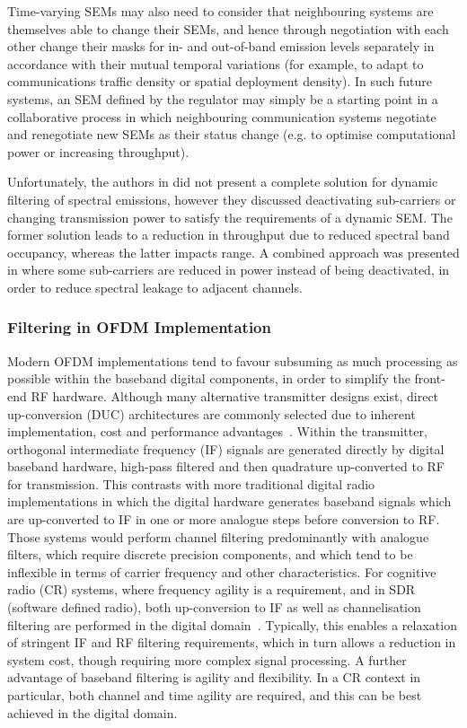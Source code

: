 Time-varying SEMs may also need to consider that neighbouring systems are themselves able to change their SEMs, and hence through negotiation with each other change their masks for in- and out-of-band emission levels separately in accordance with their mutual temporal variations (for example, to adapt to communications traffic density or spatial deployment density).
In such future systems, an SEM defined by the regulator may simply be a starting point in a collaborative process in which neighbouring communication systems negotiate and renegotiate new SEMs as their status change (e.g. to optimise computational power or increasing throughput).

Unfortunately, the authors in \cite{Forde2010} did not present a complete solution for dynamic filtering of spectral emissions, however they discussed deactivating sub-carriers or changing transmission power to satisfy the requirements of a dynamic SEM.
The former solution leads to a reduction in throughput due to reduced spectral band occupancy, whereas the latter impacts range.
A combined approach was presented in \cite{Kryszkiewicz2013} where some sub-carriers are reduced in power instead of being deactivated, in order to reduce spectral leakage to adjacent channels.

\subsubsection{Filtering in OFDM Implementation}
\label{sec:how_ofdm_works}

Modern OFDM implementations tend to favour subsuming as much processing as possible within the baseband digital components, in order to simplify the front-end RF hardware.
Although many alternative transmitter designs exist, direct up-conversion (DUC) architectures are commonly selected due to inherent implementation, cost and performance advantages~\cite{masse2006direct}.
Within the transmitter, orthogonal intermediate frequency (IF) signals are generated directly by digital baseband hardware, high-pass filtered and then quadrature up-converted to RF for transmission.
This contrasts with more traditional digital radio implementations in which the digital hardware generates baseband signals which are up-converted to IF in one or more analogue steps before conversion to RF.
Those systems would perform channel filtering predominantly with analogue filters, which require discrete precision components, and which tend to be inflexible in terms of carrier frequency and other characteristics.
For cognitive radio (CR) systems, where frequency agility is a requirement, and in SDR (software defined radio), both up-conversion to IF as well as channelisation filtering are performed in the digital domain~\cite{Chen2005,Dowle2006}.
Typically, this enables a relaxation of stringent IF and RF filtering requirements, which in turn allows a reduction in system cost, though requiring more complex signal processing.
A further advantage of baseband filtering is agility and flexibility.
In a CR context in particular, both channel and time agility are required, and this can be best achieved in the digital domain.

